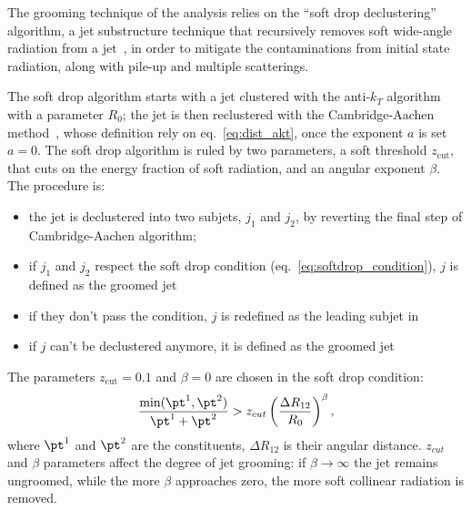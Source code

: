 \noindent The grooming technique of the analysis relies on the ``soft drop declustering'' algorithm, a jet substructure technique that recursively removes soft wide-angle radiation from a jet~\cite{Larkoski:2014wba}, in order to mitigate the contaminations from initial state radiation, along with pile-up and multiple scatterings.

\noindent The soft drop algorithm starts with a jet clustered with the anti-$k_T$ algorithm with a parameter $R_0$; the jet is then reclustered with the Cambridge-Aachen method~\cite{Dokshitzer:1997in}, whose definition rely on eq.~\ref{eq:dist_akt}, once the exponent $a$ is set $a=0$. The soft drop algorithm is ruled by two parameters, a soft threshold $z_{\text{cut}}$, that cuts on the energy fraction of soft radiation, and an angular exponent $\beta$. The procedure is:
\begin{itemize}
\item the jet is declustered into two subjets, $j_1$ and $j_2$, by reverting the final step of Cambridge-Aachen algorithm;
\item if $j_1$ and $j_2$ respect the soft drop condition (eq.~\ref{eq:softdrop_condition}), $j$ is defined as the groomed jet
\item if they don't pass the condition, $j$ is redefined as the leading subjet in \pt
\item if $j$ can't be declustered anymore, it is defined as the groomed jet
\end{itemize}

\noindent The parameters $z_{\text{cut}} = 0.1$ and $\beta = 0$ are chosen in the soft drop condition:
\begin{equation}
\frac{\min(\pt^1,\pt^2)}{\pt^1+\pt^2} > z_{cut} \left( \frac{\Delta R_{12}}{R_0} \right)^\beta,
\label{eq:softdrop_condition}
\end{equation}
\noindent where $\pt^1$ and $\pt^2$ are the constituents, $\Delta R_{12}$ is their angular distance. $z_{cut}$ and $\beta$ parameters affect the degree of jet grooming: if $\beta \to \infty$ the jet remains ungroomed, while the more $\beta$ approaches zero, the more soft collinear radiation is removed. %

